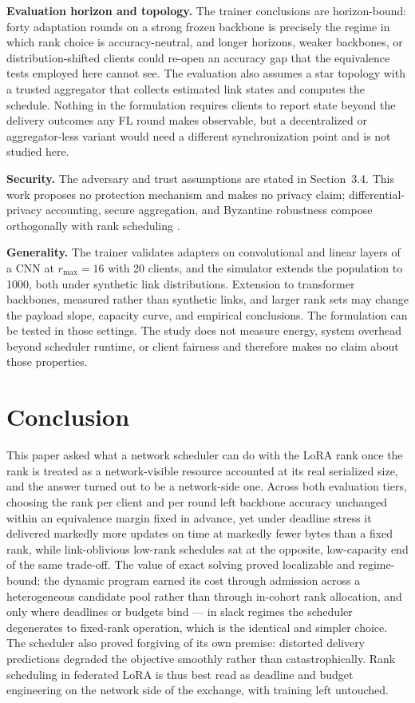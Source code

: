\documentclass[a4paper,fleqn]{cas-dc}
\begin{document}
\textbf{Evaluation horizon and topology.} The trainer conclusions are horizon-bound: forty adaptation rounds on a strong frozen backbone is precisely the regime in which rank choice is accuracy-neutral, and longer horizons, weaker backbones, or distribution-shifted clients could re-open an accuracy gap that the equivalence tests employed here cannot see. The evaluation also assumes a star topology with a trusted aggregator that collects estimated link states and computes the schedule. Nothing in the formulation requires clients to report state beyond the delivery outcomes any FL round makes observable, but a decentralized or aggregator-less variant would need a different synchronization point and is not studied here.

\textbf{Security.} The adversary and trust assumptions are stated in Section~3.4. This work proposes no protection mechanism and makes no privacy claim; differential-privacy accounting, secure aggregation, and Byzantine robustness compose orthogonally with rank scheduling \cite{bonawitz2017secureagg,wei2023pfl_dp}.

\textbf{Generality.} The trainer validates adapters on convolutional and linear layers of a CNN at $r_{\max}{=}16$ with 20 clients, and the simulator extends the population to 1000, both under synthetic link distributions. Extension to transformer backbones, measured rather than synthetic links, and larger rank sets may change the payload slope, capacity curve, and empirical conclusions. The formulation can be tested in those settings. The study does not measure energy, system overhead beyond scheduler runtime, or client fairness and therefore makes no claim about those properties.

\section{Conclusion}
\label{sec:conclusion}
This paper asked what a network scheduler can do with the LoRA rank once the rank is treated as a network-visible resource accounted at its real serialized size, and the answer turned out to be a network-side one. Across both evaluation tiers, choosing the rank per client and per round left backbone accuracy unchanged within an equivalence margin fixed in advance, yet under deadline stress it delivered markedly more updates on time at markedly fewer bytes than a fixed rank, while link-oblivious low-rank schedules sat at the opposite, low-capacity end of the same trade-off. The value of exact solving proved localizable and regime-bound: the dynamic program earned its cost through admission across a heterogeneous candidate pool rather than through in-cohort rank allocation, and only where deadlines or budgets bind --- in slack regimes the scheduler degenerates to fixed-rank operation, which is the identical and simpler choice. The scheduler also proved forgiving of its own premise: distorted delivery predictions degraded the objective smoothly rather than catastrophically. Rank scheduling in federated LoRA is thus best read as deadline and budget engineering on the network side of the exchange, with training left untouched.
\end{document}
